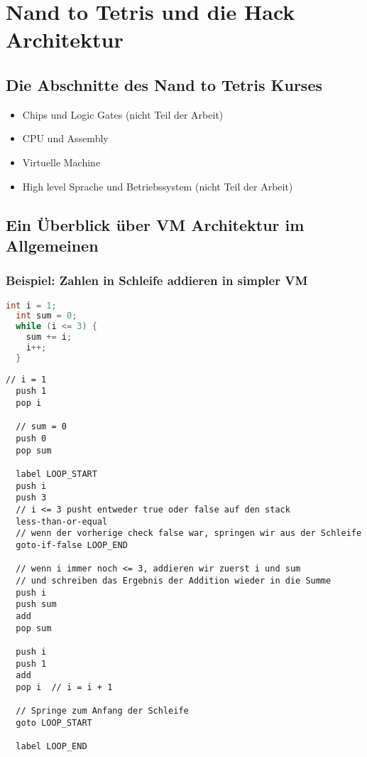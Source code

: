 \section{Nand to Tetris und die Hack Architektur}
\subsection{Die Abschnitte des Nand to Tetris Kurses}
\begin{itemize}
  \item Chips und Logic Gates (nicht Teil der Arbeit)
  \item CPU und Assembly
  \item Virtuelle Machine
  \item High level Sprache und Betriebssystem (nicht Teil der Arbeit)
\end{itemize}

\subsection{Ein Überblick über VM Architektur im Allgemeinen}
\subsubsection{Beispiel: Zahlen in Schleife addieren in simpler VM}
\begin{lstlisting}[language=C, caption={Berechne 1 + 2 + 3 in C}, captionpos=b]
  int i = 1;
  int sum = 0;
  while (i <= 3) {
    sum += i;
    i++;
  }
\end{lstlisting}
\begin{lstlisting}[caption={Berechne 1 + 2 + 3 in einer Stack-basierten VM}, captionpos=b]
  // i = 1
  push 1
  pop i

  // sum = 0
  push 0
  pop sum

  label LOOP_START
  push i
  push 3
  // i <= 3 pusht entweder true oder false auf den stack
  less-than-or-equal
  // wenn der vorherige check false war, springen wir aus der Schleife
  goto-if-false LOOP_END

  // wenn i immer noch <= 3, addieren wir zuerst i und sum
  // und schreiben das Ergebnis der Addition wieder in die Summe
  push i
  push sum
  add
  pop sum

  push i
  push 1
  add
  pop i  // i = i + 1

  // Springe zum Anfang der Schleife
  goto LOOP_START

  label LOOP_END
\end{lstlisting}

